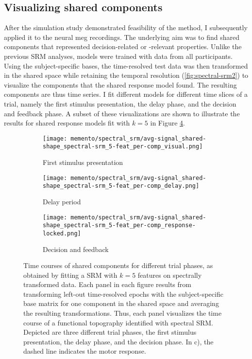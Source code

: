 \pagebreak
\subsection{Visualizing shared components}

After the simulation study demonstrated feasibility of the method, I subsequently applied it to the neural \gls{meg} recordings.
The underlying aim was to find shared components that represented decision-related or -relevant properties.
Unlike the previous \gls{SRM} analyses, models were trained with data from all participants.
Using the subject-specific bases, the time-resolved test data was then transformed in the shared space while retaining the temporal resolution (\ref{fig:spectral-srm2}) to visualize the components that the shared response model found.
The resulting components are thus time series.
I fit different models for different time slices of a trial, namely the first stimulus presentation, the delay phase, and the decision and feedback phase.
A subset of these visualizations are shown to illustrate the results for shared response models fit with $k = 5$ in Figure \ref{fig:spectral-comps-plain}.


\begin{figure}[H]
	\begin{subfigure}{0.33\textwidth}
		\texttt{[image: memento/spectral\_srm/avg-signal\_shared-shape\_spectral-srm\_5-feat\_per-comp\_visual.png]}
		\caption{First stimulus presentation}
		\label{fig:spectral-comp-visual}
	\end{subfigure}
	\begin{subfigure}{0.33\textwidth}
		\texttt{[image: memento/spectral\_srm/avg-signal\_shared-shape\_spectral-srm\_5-feat\_per-comp\_delay.png]}
		\caption{Delay period}
		\label{fig:spectral-comp-delay}
	\end{subfigure}
	\begin{subfigure}{0.33\textwidth}
		\texttt{[image: memento/spectral\_srm/avg-signal\_shared-shape\_spectral-srm\_5-feat\_per-comp\_response-locked.png]}
		\caption{Decision and feedback}
		\label{fig:spectral-comp-decision}
	\end{subfigure}
	\caption[Shared components for different trial phases]{Time courses of shared components for different trial phases, as obtained by fitting a \gls{SRM} with $k=5$ features on spectrally transformed data. Each panel in each figure results from transforming left-out time-resolved epochs with the subject-specific base matrix for one component in the shared space and averaging the resulting transformations. Thus, each panel visualizes the time course of a functional topography identified with spectral \gls{SRM}. Depicted are three different trial phases, the first stimulus presentation, the delay phase, and the decision phase. In c), the dashed line indicates the motor response.}
	\label{fig:spectral-comps-plain}
\end{figure}


